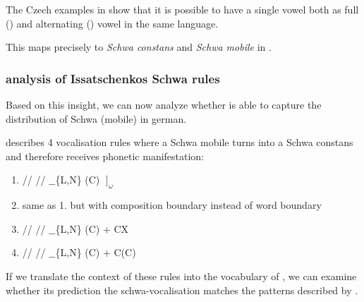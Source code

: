 The Czech examples in  show that it is possible
to have a single vowel both as full () and alternating ()
vowel in the same language.

This maps precisely to \emph{Schwa constans} and \emph{Schwa mobile} in
\textcite{issatschenko1974}.

\subsubsection{\CVCV analysis of Issatschenkos Schwa rules}
Based on this insight, we can now analyze whether \CVCV is able to capture
the distribution of Schwa (mobile) in german.



\citeauthor{issatschenko1974} describes 4 vocalisation rules where
a Schwa mobile turns into a Schwa constans and therefore receives
phonetic manifestation:

\begin{enumerate}
  \item \deriv
    {/\schwaMobi/}    %
    {/\schwaCons/}    %
    {$\_\_$\{L,N\} (C) $\;\big]_\omega$}
  \item same as 1. but with composition boundary instead of word boundary
  \item \deriv
    {/\schwaMobi/}    %
    {/\schwaCons/}    %
    {$\_\_$\{L,N\} (C) + CX}
  \item \deriv
    {/\schwaMobi/}    %
    {/\schwaCons/}    %
    {$\_\_$\{L,N\} (C) + \schwaMobi C(C)}
\end{enumerate}

If we translate the context of these rules into the
vocabulary of \CVCV, we can examine whether its prediction
 the schwa-vocalisation matches the patterns
described by \citeauthor{issatschenko1974}.

